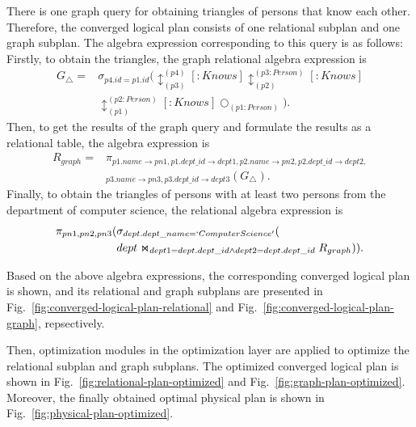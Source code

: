 \begin{example}
    There is one graph query for obtaining triangles of persons that know each other.
    Therefore, the converged logical plan consists of one relational subplan and one graph subplan.
    The algebra expression corresponding to this query is as follows:
    Firstly, to obtain the triangles, the graph relational algebra expression is
    \begin{equation*}
        \begin{split}
            G_{\triangle} = & \sigma_{p4.id = p1.id}(\updownarrow_{(p3)}^{(p4)}[:Knows]\updownarrow_{(p2)}^{(p3:Person)}[:Knows] \\
            & \updownarrow_{(p1)}^{(p2:Person)}[:Knows]\bigcirc_{(p1:Person)}).
        \end{split}
    \end{equation*}
    Then, to get the results of the graph query and formulate the results as a relational table, the algebra expression is 
    \begin{equation*}
        \begin{split}
            R_{graph} = & \pi_{p1.name\rightarrow pn1, p1.dept\_id \rightarrow dept1,p2.name\rightarrow pn2, p2.dept\_id \rightarrow dept2,} \\
            & _{p3.name\rightarrow pn3, p3.dept\_id \rightarrow dept3}(G_{\triangle}).
        \end{split}
    \end{equation*}
    Finally, to obtain the triangles of persons with at least two persons from the department of computer science, the relational algebra expression is
    \begin{equation*}
        \begin{split}
        \pi_{pn1, pn2, pn3}
        (& \sigma_{dept.dept\_name = `Computer Science'}( \\ 
        & dept \Join_{dept1=dept.dept\_id \land dept2=dept.dept\_id} R_{graph})).
        \end{split}
    \end{equation*}

    Based on the above algebra expressions, the corresponding converged logical plan is shown, and its relational and graph subplans are presented in Fig.~\ref{fig:converged-logical-plan-relational} and Fig.~\ref{fig:converged-logical-plan-graph}, repsectively.
    
    Then, optimization modules in the optimization layer are applied to optimize the relational subplan and graph subplans.
    The optimized converged logical plan is shown in Fig.~\ref{fig:relational-plan-optimized} and Fig.~\ref{fig:graph-plan-optimized}.
    Moreover, the finally obtained optimal physical plan is shown in Fig.~\ref{fig:physical-plan-optimized}.
\end{example}

